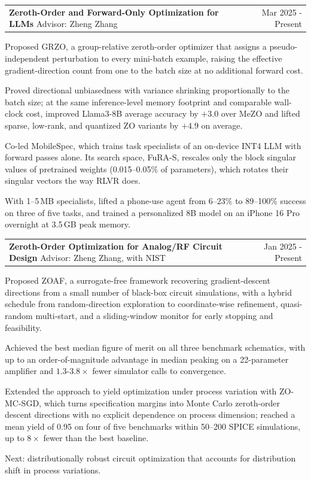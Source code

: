 \documentclass[10pt,letterpaper]{article}
\makeatletter
\newcommand{\entry}[2]{%
  \noindent\begin{tabularx}{\textwidth}{@{}X@{\hspace{1.4em}}r@{}}
    #1 & {\color{muted}#2}
  \end{tabularx}\par
}
\makeatother
\begin{document}
\entry{\textbf{Zeroth-Order and Forward-Only Optimization for LLMs} \textbar{} Advisor: Zheng Zhang}{Mar 2025 - Present}
\begin{cvitems}
  \item Proposed GRZO, a group-relative zeroth-order optimizer that assigns a pseudo-independent perturbation to every mini-batch example, raising the effective gradient-direction count from one to the batch size at no additional forward cost.
  \item Proved directional unbiasedness with variance shrinking proportionally to the batch size; at the same inference-level memory footprint and comparable wall-clock cost, improved Llama3-8B average accuracy by $+3.0$ over MeZO and lifted sparse, low-rank, and quantized ZO variants by $+4.9$ on average.
  \item Co-led MobileSpec, which trains task specialists of an on-device INT4 LLM with forward passes alone. Its search space, FuRA-S, rescales only the block singular values of pretrained weights (0.015--0.05\% of parameters), which rotates their singular vectors the way RLVR does.
  \item With 1--5\,MB specialists, lifted a phone-use agent from 6--23\% to 89--100\% success on three of five tasks, and trained a personalized 8B model on an iPhone 16 Pro overnight at 3.5\,GB peak memory.
\end{cvitems}

\vspace{0.6em}
\entry{\textbf{Zeroth-Order Optimization for Analog/RF Circuit Design} \textbar{} Advisor: Zheng Zhang, with NIST}{Jan 2025 - Present}
\begin{cvitems}
  \item Proposed ZOAF, a surrogate-free framework recovering gradient-descent directions from a small number of black-box circuit simulations, with a hybrid schedule from random-direction exploration to coordinate-wise refinement, quasi-random multi-start, and a sliding-window monitor for early stopping and feasibility.
  \item Achieved the best median figure of merit on all three benchmark schematics, with up to an order-of-magnitude advantage in median peaking on a 22-parameter amplifier and $1.3$-$3.8\times$ fewer simulator calls to convergence.
  \item Extended the approach to yield optimization under process variation with ZO-MC-SGD, which turns specification margins into Monte Carlo zeroth-order descent directions with no explicit dependence on process dimension; reached a mean yield of 0.95 on four of five benchmarks within 50--200 SPICE simulations, up to $8\times$ fewer than the best baseline.
  \item Next: distributionally robust circuit optimization that accounts for distribution shift in process variations.
\end{cvitems}
\end{document}

